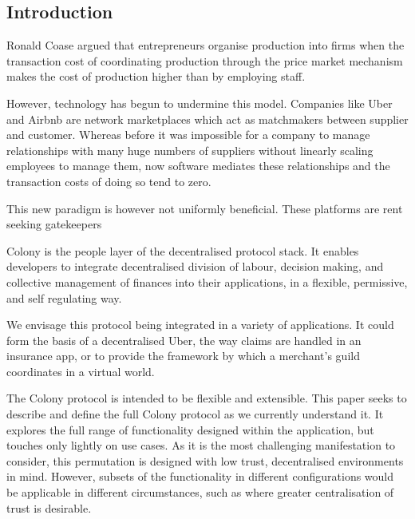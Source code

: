 \subsection*{Introduction}

Ronald Coase argued that entrepreneurs organise production into firms when the transaction cost of coordinating production through the price market mechanism makes the cost of production higher than by employing staff. \cite{The-Nature-of-the-Firm}


However, technology has begun to undermine this model. Companies like Uber and Airbnb are network marketplaces which act as matchmakers between supplier and customer. Whereas before it was impossible for a company to manage relationships with many huge numbers of suppliers without linearly scaling employees to manage them, now software mediates these relationships and the transaction costs of doing so tend to zero.

This new paradigm is however not uniformly beneficial. These platforms are rent seeking gatekeepers 

Colony is the people layer of the decentralised protocol stack. It enables developers to integrate decentralised division of labour, decision making, and collective management of finances into their applications, in a flexible, permissive, and self regulating way.

We envisage this protocol being integrated in a variety of applications. It could form the basis of a decentralised Uber, the way claims are handled in an insurance app, or to provide the framework by which a merchant’s guild coordinates in a virtual world.

The Colony protocol is intended to be flexible and extensible. This paper seeks to describe and define the full Colony protocol as we currently understand it. It explores the full range of functionality designed within the application, but touches only lightly on use cases. As it is the most challenging manifestation to consider, this permutation is designed with low trust, decentralised environments in mind. However, subsets of the functionality in different configurations would be applicable in different circumstances, such as where greater centralisation of trust is desirable.






